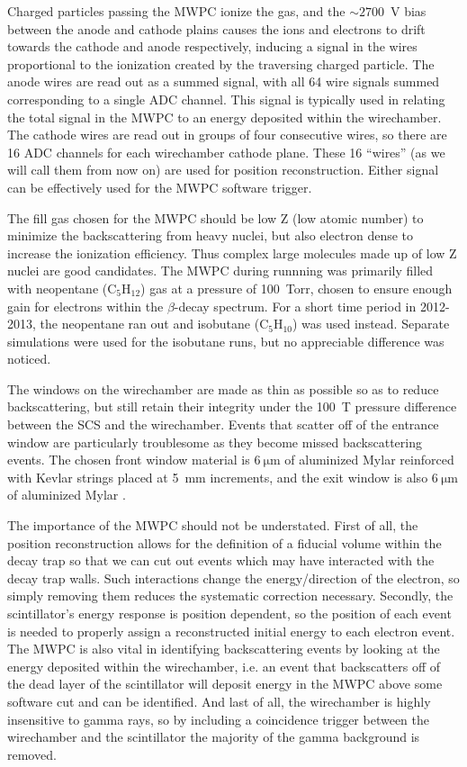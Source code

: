 Charged particles passing the MWPC ionize the gas, and the $\sim2700$~V bias between the anode and
cathode plains causes the ions and electrons to drift towards the cathode and anode respectively,
inducing a signal in the wires proportional to the ionization created by the traversing charged particle.
The anode wires are read out as a summed signal, with all 64 wire signals summed corresponding to
a single ADC channel. This signal is typically used in relating the total signal in the MWPC
to an energy deposited within the wirechamber. The cathode wires are read out in groups of four
consecutive wires, so there are 16 ADC channels for each wirechamber cathode plane. These 16
``wires'' (as we will call them from now on) are used for position reconstruction. Either
signal can be effectively used for the MWPC software trigger.

The fill
gas chosen for the MWPC should be low Z (low atomic number) to minimize the backscattering from heavy nuclei,
but also electron dense to increase the ionization efficiency. Thus complex large molecules
made up of low Z nuclei are good candidates.
The MWPC during runnning was primarily filled with neopentane ($\mathrm{C}_5\mathrm{H}_{12}$) gas at a pressure of
100~Torr, chosen to ensure enough gain for electrons within the $\beta$-decay spectrum. For a
short time period in 2012-2013, the neopentane ran out and isobutane ($\mathrm{C}_5\mathrm{H}_{10}$)
was used instead. Separate simulations were used for the isobutane runs, but no appreciable
difference was noticed.

The windows on the wirechamber are made as thin as possible so as to reduce backscattering, but still
retain their integrity under the 100~T pressure difference between the SCS and the wirechamber. Events that
scatter off of the entrance window are particularly troublesome as they become missed backscattering events.
The chosen front window material is $6\mathrm{~\mu{m}}$ of aluminized Mylar reinforced with Kevlar strings
placed at 5~mm increments, and the exit window is also $6\mathrm{~\mu{m}}$ of aluminized Mylar \cite{mpmThesis}. 

The importance of the MWPC should not be understated. First of all, the position reconstruction allows for the
definition of a fiducial volume within the decay trap so that we can cut out events which may have interacted
with the decay trap walls. Such interactions change the energy/direction of the electron, so simply removing them
reduces the systematic correction necessary. Secondly, the scintillator's energy response is position
dependent, so the position of each event is needed to properly assign a reconstructed initial energy to
each electron event. The MWPC is also vital in identifying backscattering events by looking at the energy
deposited within the wirechamber, i.e. an event that backscatters off of the dead layer of the scintillator
will deposit energy in the MWPC above some software cut and can be identified. And last of all,
the wirechamber is highly insensitive to gamma rays, so by including a coincidence trigger between the wirechamber
and the scintillator the majority of the gamma background is removed.


